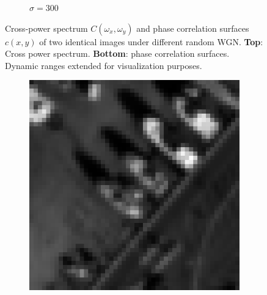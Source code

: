 \begin{figure}[htpb]
\begin{subfigure}{.25\textwidth}
\caption{$\sigma = 300$}
\end{subfigure}
\caption{Cross-power spectrum $C(\omega_x, \omega_y)$ and phase correlation surfaces $c(x,y)$ of two identical images under different random WGN. \textbf{Top}: Cross power spectrum. \textbf{Bottom}: phase correlation surfaces. Dynamic ranges extended for visualization purposes.}
\label{fig:phaseCorrelationNoiseless}
\end{figure}

\begin{figure}[htpb]
\centering
\begin{subfigure}{.25\textwidth}
\includegraphics[width=1\textwidth]{img/Im1sigma0}
\end{subfigure}%
\begin{subfigure}{.25\textwidth}

\end{subfigure}
\end{figure}
